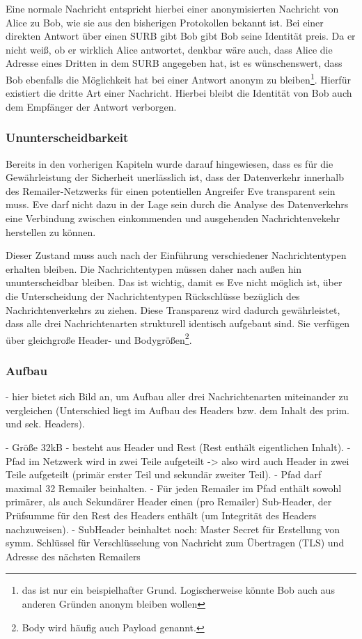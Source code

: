 Eine normale Nachricht entspricht hierbei einer anonymisierten Nachricht von Alice zu Bob, wie sie aus den bisherigen Protokollen bekannt ist. Bei einer direkten Antwort über einen SURB gibt Bob gibt Bob seine Identität preis. Da er nicht weiß, ob er wirklich Alice antwortet, denkbar wäre auch, dass Alice die Adresse eines Dritten in dem SURB angegeben hat, ist es wünschenswert, dass Bob ebenfalls die Möglichkeit hat bei einer Antwort anonym zu bleiben\footnote{das ist nur ein beispielhafter Grund. Logischerweise könnte Bob auch aus anderen Gründen anonym bleiben wollen}. Hierfür existiert die dritte Art einer Nachricht. Hierbei bleibt die Identität von Bob auch dem Empfänger der Antwort verborgen.

\subsubsection{Ununterscheidbarkeit}
Bereits in den vorherigen Kapiteln wurde darauf hingewiesen, dass es für die Gewährleistung der Sicherheit unerlässlich ist, dass der Datenverkehr innerhalb des Remailer-Netzwerks für einen potentiellen Angreifer Eve transparent sein muss. Eve darf nicht dazu in der Lage sein durch die Analyse des Datenverkehrs eine Verbindung zwischen einkommenden und ausgehenden Nachrichtenvekehr herstellen zu können.

Dieser Zustand muss auch nach der Einführung verschiedener Nachrichtentypen erhalten bleiben.  Die Nachrichtentypen müssen daher nach außen hin ununterscheidbar bleiben. Das ist wichtig, damit es Eve nicht möglich ist, über die Unterscheidung der Nachrichtentypen Rückschlüsse bezüglich des Nachrichtenverkehrs zu ziehen. Diese Transparenz wird dadurch gewährleistet, dass alle drei Nachrichtenarten strukturell identisch aufgebaut sind. Sie verfügen über gleichgroße Header- und Bodygrößen\footnote{Body wird häufig auch Payload genannt.}.

\subsubsection{Aufbau}
- hier bietet sich Bild an, um Aufbau aller drei Nachrichtenarten miteinander zu vergleichen (Unterschied liegt im Aufbau des Headers bzw. dem Inhalt des prim. und sek. Headers).

- Größe 32kB
- besteht aus Header und Rest (Rest enthält eigentlichen Inhalt).
- Pfad im Netzwerk wird in zwei Teile aufgeteilt -> also wird auch Header in zwei Teile aufgeteilt (primär erster Teil und sekundär zweiter Teil).
- Pfad darf maximal 32 Remailer beinhalten.
- Für jeden Remailer im Pfad enthält sowohl primärer, als auch Sekundärer Header einen (pro Remailer) Sub-Header, der Prüfsumme für den Rest des Headers enthält (um Integrität des Headers nachzuweisen).
- SubHeader beinhaltet noch: Master Secret für Erstellung von symm. Schlüssel für Verschlüsselung von Nachricht zum Übertragen (TLS) und Adresse des nächsten Remailers

